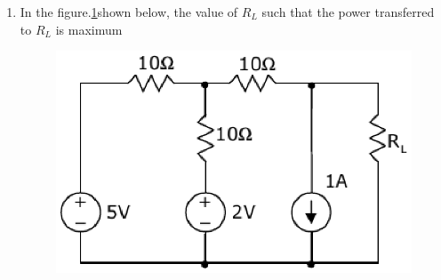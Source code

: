 \documentclass[journal,12pt,twocolumn]{IEEEtran}
\begin{document}
\begin{enumerate}
\item In the figure.\ref{fig81}shown below, the value of $ R_{L} $ such that the power transferred to $ R_{L} $ is maximum
\begin{enumerate}
\setlength\itemsep{2em}
\begin{figure}[!h]
\begin{center}
\includegraphics[scale=0.7]{./figs/fig81.eps}
\caption{}
\label{fig81}
\end{center}
\end{figure}
\end{enumerate}


\end{enumerate}
\end{document}
